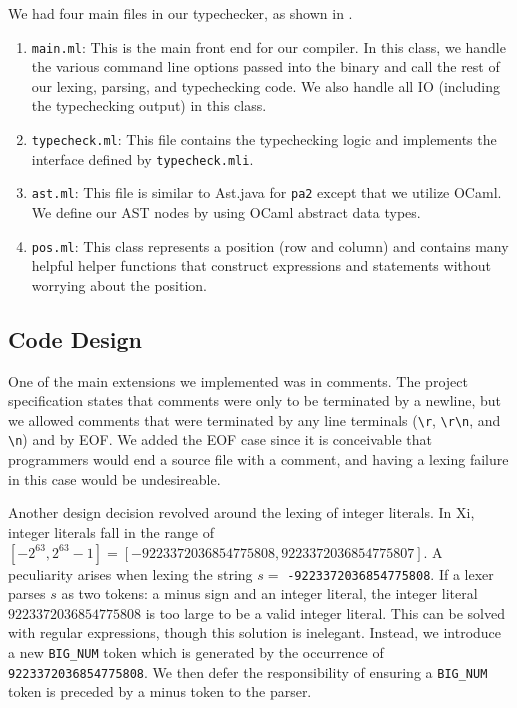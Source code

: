 \documentclass{hw}
\begin{document}
We had four main files in our typechecker, as shown in .
\begin{enumerate}
  \item{\texttt{main.ml}:}
    This is the main front end for our compiler. In this class, we handle the
    various command line options passed into the binary and call the rest of
    our lexing, parsing, and typechecking code. We also handle all IO (including the typechecking
    output) in this class.

  \item{\texttt{typecheck.ml}:}
    This file contains the typechecking logic and implements the interface defined by \texttt{typecheck.mli}.
    
  \item{\texttt{ast.ml}:}
    This file is similar to Ast.java for \texttt{pa2} except that we utilize OCaml. We define our AST nodes by using OCaml abstract data types.

  \item{\texttt{pos.ml}:}
    This class represents a position (row and column) and contains many helpful helper functions that construct expressions and statements without worrying about the position.

\end{enumerate}

\subsection{Code Design}
One of the main extensions we implemented was in comments. The project
specification states that comments were only to be terminated by a newline, but
we allowed comments that were terminated by any line terminals (\verb$\r$,
\verb$\r\n$, and \verb$\n$) and by EOF.  We added the EOF case since it is
conceivable that programmers would end a source file with a comment, and having
a lexing failure in this case would be undesireable.

\newcommand{\minint}{9223372036854775808}
\newcommand{\maxint}{9223372036854775807}
Another design decision revolved around the lexing of integer literals. In Xi,
integer literals fall in the range of $[-2^{63}, 2^{63}-1] = [-\minint,
\maxint]$. A peculiarity arises when lexing the string $s = $
\texttt{-\minint}. If a lexer parses $s$ as two tokens: a minus sign and an
integer literal, the integer literal $\minint$ is too large to be a valid
integer literal. This can be solved with regular expressions, though this
solution is inelegant. Instead, we introduce a new \texttt{BIG\_NUM} token
which is generated by the occurrence of \texttt{\minint}. We then defer the
responsibility of ensuring a \texttt{BIG\_NUM} token is preceded by a minus
token to the parser.
\end{document}
